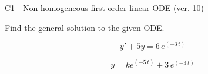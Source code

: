 \begin{exercise}
  \begin{exerciseTitle}C1 - Non-homogeneous first-order linear ODE (ver. 10)\end{exerciseTitle}
  \begin{exerciseStatement}
    
Find the general solution to the given ODE.

    
\[y'+5y= 6 \, e^{\left(-3 \, t\right)}\]

  \end{exerciseStatement}
  \begin{exerciseAnswer}
    
\[y= k e^{\left(-5 \, t\right)} + 3 \, e^{\left(-3 \, t\right)}\]

  \end{exerciseAnswer}
\end{exercise}